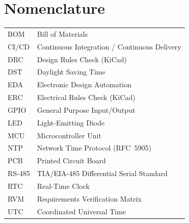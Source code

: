 %
%
%

\chapter*{Nomenclature}

\begin{center}
    \begin{tabular}{C{2.5cm}L{10cm}}
        BOM     & Bill of Materials \\
        CI/CD   & Continuous Integration / Continuous Delivery \\
        DRC     & Design Rules Check (KiCad) \\
        DST     & Daylight Saving Time \\
        EDA     & Electronic Design Automation \\
        ERC     & Electrical Rules Check (KiCad) \\
        GPIO    & General Purpose Input/Output \\
        LED     & Light-Emitting Diode \\
        MCU     & Microcontroller Unit \\
        NTP     & Network Time Protocol (RFC~5905) \\
        PCB     & Printed Circuit Board \\
        RS-485  & TIA/EIA-485 Differential Serial Standard \\
        RTC     & Real-Time Clock \\
        RVM     & Requirements Verification Matrix \\
        UTC     & Coordinated Universal Time \\
    \end{tabular}
\end{center}
